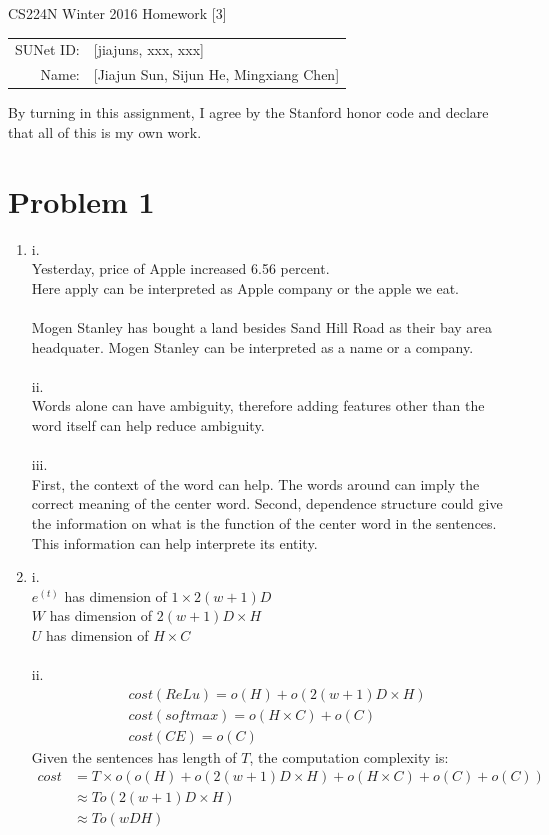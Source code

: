 \documentclass[10pt]{article}
\begin{document}
\begin{center}
{\Large CS224N Winter 2016 Homework [3]}

\begin{tabular}{rl}
SUNet ID: & [jiajuns, xxx, xxx] \\
Name: & [Jiajun Sun, Sijun He, Mingxiang Chen] \\
\end{tabular}
\end{center}

By turning in this assignment, I agree by the Stanford honor code and declare
that all of this is my own work.

\section*{Problem 1}
\begin{enumerate}[label=(\alph*)]
\item
i.\\
Yesterday, price of Apple increased 6.56 percent.\\
Here apply can be interpreted as Apple company or the apple we eat.\\
\\
Mogen Stanley has bought a land besides Sand Hill Road as their bay area headquater.
Mogen Stanley can be interpreted as a name or a company.\\
\\

ii.\\
Words alone can have ambiguity, therefore adding features other than the word itself can help reduce ambiguity.\\
\\

iii.\\
First, the context of the word can help. The words around can imply the correct meaning of the center word.
Second, dependence structure could give the information on what is the function of the center word in the sentences.
This information can help interprete its entity.

\item
i.\\
$e^{(t)}$ has dimension of $1 \times 2(w+1)D$\\
$W$ has dimension of $2(w+1)D \times H$\\
$U$ has dimension of $H \times C$\\
\\
ii.\\
$$
\begin{aligned}
& cost(ReLu) = o(H) + o(2(w+1)D \times H)\\
& cost(softmax) = o(H \times C) + o(C)\\
& cost(CE) = o(C)
\end{aligned}
$$
Given the sentences has length of $T$, the computation complexity is:
$$
\begin{aligned}
cost
& = T \times o(o(H) + o(2(w+1)D \times H) + o(H \times C) + o(C) + o(C))\\
& \approx T o(2(w+1)D \times H)\\
& \approx T o(wDH)
\end{aligned}
$$


\end{enumerate}
\end{document}
